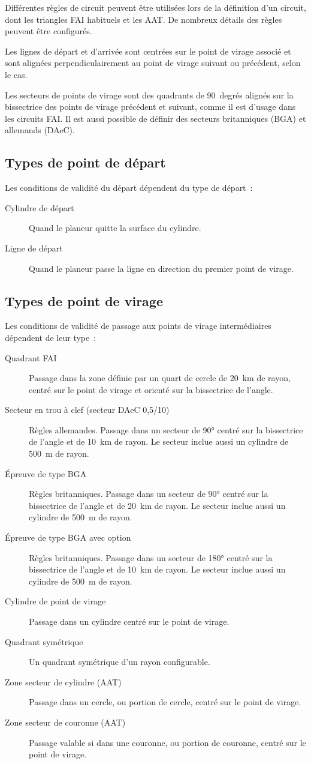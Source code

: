 Différentes règles de circuit peuvent être utilisées lors de la définition d'un circuit, dont les triangles FAI habituels et les AAT.\@
De nombreux détails des règles peuvent être configurés.

Les lignes de départ et d'arrivée sont centrées sur le point de virage associé
et sont alignées perpendiculairement au point de virage suivant ou précédent,
selon le cas.

Les secteurs de points de virage
sont des quadrants de 90~degrés alignés sur la bissectrice des
points de virage précédent et suivant, comme il est d'usage dans les circuits FAI.\@
Il est aussi possible de définir des secteurs britanniques (BGA) et allemands (DAeC).

\subsection*{Types de point de départ}
Les conditions de validité du départ dépendent du type de départ~:
\begin{description}
\item[Cylindre de départ] Quand le planeur quitte la surface du cylindre.
\item[Ligne de départ] Quand le planeur passe la ligne en direction du premier point de virage.
\end{description}

\subsection*{Types de point de virage}
Les conditions de validité de passage aux points de virage intermédiaires dépendent de leur type~:
\begin{description}
\item[Quadrant FAI] Passage dans la zone définie par un quart de cercle de 20~km de rayon, centré sur le point de virage et orienté sur la bissectrice de l'angle.
\item[Secteur en trou à clef (secteur DAeC 0,5/10)] Règles allemandes.
Passage dans un secteur de 90° centré sur la bissectrice de l'angle et de 10~km de rayon.
Le secteur inclue aussi un cylindre de 500~m de rayon.
\item[Épreuve de type BGA]  Règles britanniques. Passage dans un secteur de 90° centré sur la bissectrice de l'angle et de 20~km de rayon.
Le secteur inclue aussi un cylindre de 500~m de rayon.
\item[Épreuve de type BGA avec option] Règles britanniques. Passage dans un secteur de 180° centré sur la bissectrice de l'angle et de 10~km de rayon.
Le secteur inclue aussi un cylindre de 500~m de rayon.
\item[Cylindre de point de virage]  Passage dans un cylindre centré sur le point de virage.
\item[Quadrant symétrique] Un quadrant symétrique d'un rayon configurable.
\item[Zone secteur de cylindre (AAT)]  Passage dans un cercle, ou portion de cercle, centré sur le point de virage.
\item[Zone secteur de couronne (AAT)]  Passage valable si dans une couronne, ou portion de couronne, centré sur le point de virage.
\end{description}

